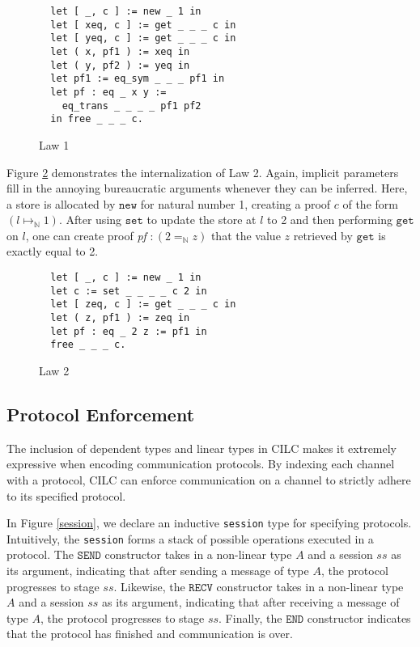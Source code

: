 \documentclass[sigplan,screen,review,anonymous]{acmart}
\newcommand{\new}{\texttt{new}}
\newcommand{\get}{\texttt{get}}
\newcommand{\set}{\texttt{set}}
\newcommand{\SEND}{\texttt{SEND}}
\newcommand{\RECV}{\texttt{RECV}}
\newcommand{\END}{\texttt{END}}
\begin{document}
\begin{figure}[h]
  \caption{Law 1}
  \begin{verbatim}
  let [ _, c ] := new _ 1 in
  let [ xeq, c ] := get _ _ _ c in
  let [ yeq, c ] := get _ _ _ c in
  let ( x, pf1 ) := xeq in
  let ( y, pf2 ) := yeq in
  let pf1 := eq_sym _ _ _ pf1 in
  let pf : eq _ x y := 
    eq_trans _ _ _ _ pf1 pf2 
  in free _ _ _ c.
  \end{verbatim}
  \label{law1}
  \Description{}
\end{figure}

Figure \ref{law2} demonstrates the internalization of Law 2. Again, implicit parameters fill in the annoying bureaucratic arguments whenever they can be inferred. Here, a store is allocated by $\new$ for natural number 1, creating a proof $c$ of the form $(l \mapsto_\mathbb{N} 1)$. After using $\set$ to update the store at $l$ to 2 and then performing $\get$ on $l$, one can create proof \textit{pf} $: (2 =_\mathbb{N} z)$ that the value $z$ retrieved by $\get$ is exactly equal to 2.

\begin{figure}[h]
  \caption{Law 2}
  \begin{verbatim}
  let [ _, c ] := new _ 1 in
  let c := set _ _ _ _ c 2 in
  let [ zeq, c ] := get _ _ _ c in
  let ( z, pf1 ) := zeq in
  let pf : eq _ 2 z := pf1 in
  free _ _ _ c.
  \end{verbatim}
  \label{law2}
  \Description{}
\end{figure}

\subsection{Protocol Enforcement}
The inclusion of dependent types and linear types in CILC makes it extremely expressive when encoding communication protocols. By indexing each channel with a protocol, CILC can enforce communication on a channel to strictly adhere to its specified protocol.

In Figure \ref{session}, we declare an inductive \texttt{session} type for specifying protocols. Intuitively, the \texttt{session}  forms a stack of possible operations executed in a protocol. The $\SEND$ constructor takes in a non-linear type $A$ and a session $ss$ as its argument, indicating that after sending a message of type $A$, the protocol progresses to stage $ss$. Likewise, the $\RECV$ constructor takes in a non-linear type $A$ and a session $ss$ as its argument, indicating that after receiving a message of type $A$, the protocol progresses to stage $ss$. Finally, the $\END$ constructor indicates that the protocol has finished and communication is over.
\end{document}
